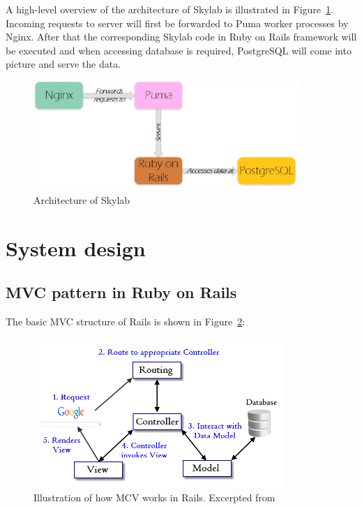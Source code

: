 A high-level overview of the architecture of Skylab is illustrated in Figure~\ref{fig:Skylabarch}. Incoming requests to server will first be forwarded to Puma worker processes by Nginx. After that the corresponding Skylab code in Ruby on Rails framework will be executed and when accessing database is required, PostgreSQL will come into picture and serve the data.

\begin{figure}[h]
  \centering
  \includegraphics[width=0.9\textwidth]{Images/Skylab_Arch.png}
  \caption{Architecture of Skylab}
  \label{fig:Skylabarch}
\end{figure}

\section{System design}

\subsection{MVC pattern in Ruby on Rails}

The basic MVC structure of Rails is shown in Figure~\ref{fig:RailsMVC}:

\begin{figure}[h]
  \centering
  \includegraphics[width=0.85\textwidth]{Images/Rails_MVC.png}
  \caption{Illustration of how MCV works in Rails. Excerpted from \cite{citationMVC}}
  \label{fig:RailsMVC}
\end{figure}

